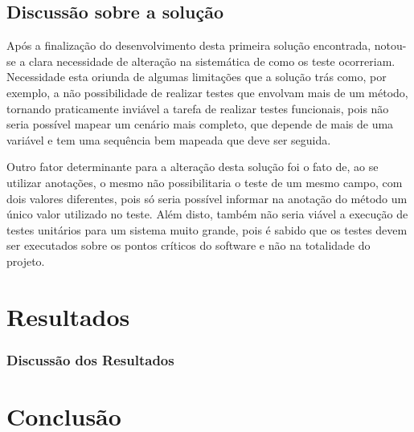 \documentclass[tg]{mdtufsm}
\begin{document}
\section{Discussão sobre a solução}
Após a finalização do desenvolvimento desta primeira solução encontrada, notou-se a clara necessidade de alteração na sistemática de como os teste ocorreriam. Necessidade esta oriunda de algumas limitações que a solução trás
como, por exemplo, a não possibilidade de realizar testes que envolvam mais de um método, tornando praticamente inviável a tarefa de realizar testes funcionais, pois não seria possível mapear um cenário mais completo, que depende
de mais de uma variável e tem uma sequência bem mapeada que deve ser seguida.

Outro fator determinante para a alteração desta solução foi o fato de, ao se utilizar anotações, o mesmo não possibilitaria o teste de um mesmo campo, com dois valores diferentes, pois só seria possível informar na anotação do
método um único valor utilizado no teste. Além disto, também não seria viável a execução de testes unitários para um sistema muito grande, pois é sabido que os testes devem ser executados sobre os pontos críticos do software e não na totalidade do projeto.

\chapter{Resultados}

\subsection{Discussão dos Resultados}
\chapter{Conclusão}

\setlength{\baselineskip}{\baselineskip}


\end{document}
